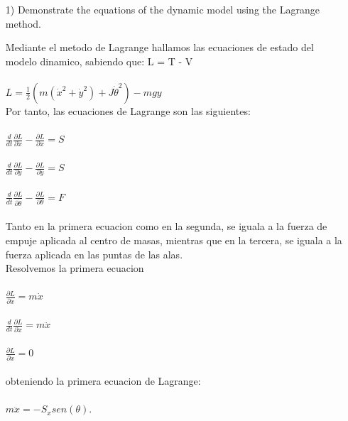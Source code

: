 \documentclass{article}
\begin{document}
\begin{itemize}

\item[1)] {\color{gray} Demonstrate the equations of the dynamic model using the Lagrange method.}

Mediante el metodo de Lagrange hallamos las ecuaciones de estado del modelo dinamico, sabiendo que: L = T - V\\\\
		$L = \frac{1}{2}(m(\dot{x}^2+\dot{y}^2)+J\dot{\theta}^2) - mgy$\\

Por tanto, las ecuaciones de Lagrange son las siguientes:\\\\
		$\frac{d}{dt}\frac{\partial L}{\partial \dot{x}} - \frac{\partial L}{\partial x} = S$\\\\
		$\frac{d}{dt}\frac{\partial L}{\partial \dot{y}} - \frac{\partial L}{\partial y} = S$\\\\
		$\frac{d}{dt}\frac{\partial L}{\partial \dot{\theta}} - \frac{\partial L}{\partial \theta} = F$\\\\

Tanto en la primera ecuacion como en la segunda, se iguala a la fuerza de empuje aplicada al centro de masas, mientras que en la tercera, se iguala a la fuerza aplicada en las puntas de las alas.\\

Resolvemos la primera ecuacion\\\\
		$\frac{\partial L}{\partial \dot{x}} = m\dot{x}$\\\\
		$\frac{d}{dt}\frac{\partial L}{\partial \dot{x}} = m\ddot{x}$\\\\
		$\frac{\partial L}{\partial x} = 0$\\\\
obteniendo la primera ecuacion de Lagrange:\\\\
		$m\ddot{x} = -S_x sen(\theta)$.\\


\end{itemize}
\end{document}
